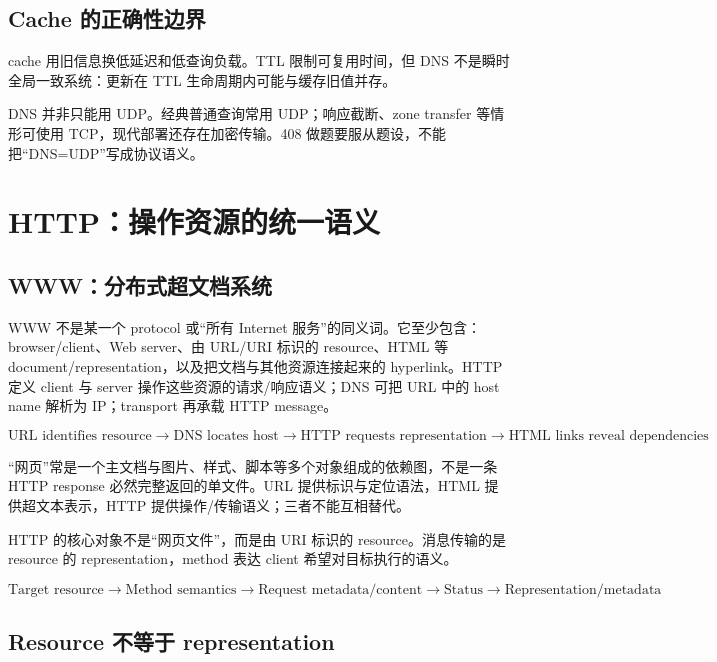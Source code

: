 \documentclass[UTF8,fontset=none,11pt,a4paper]{ctexart}
\begin{document}
\subsection{Cache
的正确性边界}\label{34-cache-ux7684ux6b63ux786eux6027ux8fb9ux754c}

cache 用旧信息换低延迟和低查询负载。TTL 限制可复用时间，但 DNS
不是瞬时全局一致系统：更新在 TTL 生命周期内可能与缓存旧值并存。

DNS 并非只能用 UDP。经典普通查询常用 UDP；响应截断、zone transfer
等情形可使用 TCP，现代部署还存在加密传输。408
做题要服从题设，不能把``DNS=UDP''写成协议语义。

\section{HTTP：操作资源的统一语义}\label{4-httpux64cdux4f5cux8d44ux6e90ux7684ux7edfux4e00ux8bedux4e49}

\subsection{WWW：分布式超文档系统}

WWW 不是某一个 protocol 或“所有 Internet 服务”的同义词。它至少包含：browser/client、Web server、由 URL/URI 标识的 resource、HTML 等 document/representation，以及把文档与其他资源连接起来的 hyperlink。HTTP 定义 client 与 server 操作这些资源的请求/响应语义；DNS 可把 URL 中的 host name 解析为 IP；transport 再承载 HTTP message。

\[
\boxed{\text{URL identifies resource}\to\text{DNS locates host}\to
\text{HTTP requests representation}\to\text{HTML links reveal dependencies}}
\]

“网页”常是一个主文档与图片、样式、脚本等多个对象组成的依赖图，不是一条 HTTP response 必然完整返回的单文件。URL 提供标识与定位语法，HTML 提供超文本表示，HTTP 提供操作/传输语义；三者不能互相替代。

HTTP 的核心对象不是``网页文件''，而是由 URI 标识的
resource。消息传输的是 resource 的 representation，method 表达 client
希望对目标执行的语义。

\[
\boxed{
\text{Target resource}
\to \text{Method semantics}
\to \text{Request metadata/content}
\to \text{Status}
\to \text{Representation/metadata}
}
\]

\subsection{Resource 不等于
representation}\label{41-resource-ux4e0dux7b49ux4e8e-representation}
\end{document}
